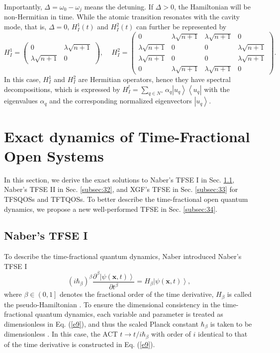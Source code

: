 \documentclass[
showpacs,  %
showkeys,  %
aps,       %
amsthm,    %
amsmath,   %
amsfonts,  %
amssymb    %
]{revtex4-1}          %
\begin{document}
Importantly, $\Delta  = {\omega _0} - {\omega _j}$ means the detuning. If $\Delta>0$, the Hamiltonian will be non-Hermitian in time. While the atomic transition resonates with the cavity mode, that is, $\Delta=0$, ${H^1_I}(t)$ and ${H^2_I}(t)$ can further be represented by
\begin{equation}
\label{e8}
{H^1_I} = \left( {\begin{array}{*{20}{c}}
0&{\lambda \sqrt {n + 1} }\\
{\lambda \sqrt {n + 1} }&0
\end{array}} \right), \,\,\,\,\,\,\,
{H^2_I} = \left( {\begin{array}{*{20}{c}}
0&{\lambda \sqrt {n + 1} }&{\lambda \sqrt {n + 1} }&0\\
{\lambda \sqrt {n + 1} }&0&0&{\lambda \sqrt {n + 1} }\\
{\lambda \sqrt {n + 1} }&0&0&{\lambda \sqrt {n + 1} }\\
0&{\lambda \sqrt {n + 1} }&{\lambda \sqrt {n + 1} }&0
\end{array}} \right).
\end{equation}
In this case, ${H^1_I}$ and ${H^2_I}$ are Hermitian operators, hence they have spectral decompositions, which is expressed by ${H^l_I} = \sum\limits_{q \in N^+} {{\alpha _q}} \left| {{u_q}} \right\rangle \left\langle {{u_q}} \right|$ with the eigenvalues ${{\alpha _q}}$ and the corresponding normalized eigenvectors $\left| {{u_q}} \right\rangle$.

\section{Exact dynamics of Time-Fractional Open Systems}
\label{sec:3}
In this section, we derive the exact solutions to Naber's TFSE I in Sec. \ref{subsec:31}, Naber's TFSE II in Sec. \ref{subsec:32}, and XGF's TFSE in Sec. \ref{subsec:33} for TFSQOSs and TFTQOSs. To better describe the time-fractional open quantum dynamics, we propose a new well-performed TFSE in Sec. \ref{subsec:34}.

\subsection{Naber's TFSE I}
\label{subsec:31}
To describe the time-fractional quantum dynamics, Naber introduced Naber's TFSE I \cite{Naber2004}
\begin{equation}
\label{e9}
{(i\hbar_\beta)^\beta}\frac{{{\partial ^\beta }\left| {\psi (\boldsymbol{x},t)} \right\rangle }}{{\partial {t^\beta }}} = {H_\beta }\left| {\psi (\boldsymbol{x},t)} \right\rangle,
\end{equation}
where $\beta\in\left({0,1}\right]$ denotes the fractional order of the time derivative, ${H_\beta}$ is called the pseudo-Hamiltonian \cite{Dong2008,Laskin2017}. To ensure the dimensional consistency in the time-fractional quantum dynamics, each variable and parameter is treated as dimensionless in Eq. (\ref{e9}), and thus the scaled Planck constant $\hbar_\beta$ is taken to be dimensionless \cite{Naber2004,Dong2008}. In this case, the ACT $t\to t/i\hbar_\beta$ with order of $i$ identical to that of the time derivative is constructed in Eq. (\ref{e9}).
\end{document}
